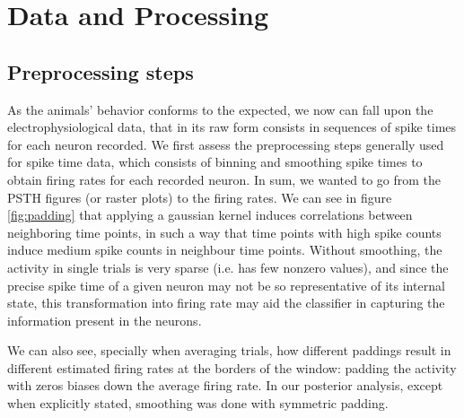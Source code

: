 \chapter{Data and Processing}
\section{Preprocessing steps}
As the animals' behavior conforms to the expected, we now can fall upon the electrophysiological data, that in its raw form consists in sequences of spike times for each neuron recorded. We first assess the preprocessing steps generally used for spike time data, which consists of binning and smoothing spike times to obtain firing rates for each recorded neuron. In sum, we wanted to go from the PSTH figures (or raster plots) to the firing rates. We can see in figure \ref{fig:padding} that applying a gaussian kernel induces correlations between neighboring time points, in such a way that time points with high spike counts induce medium spike counts in neighbour time points. Without smoothing, the activity in single trials is very sparse (i.e. has few nonzero values), and since the precise spike time of a given neuron may not be so representative of its internal state, this transformation into firing rate may aid the classifier in capturing the information present in the neurons.

We can also see, specially when averaging trials, how different paddings result in different estimated firing rates at the borders of the window: padding the activity with zeros biases down the average firing rate. In our posterior analysis, except when explicitly stated, smoothing was done with symmetric padding.

